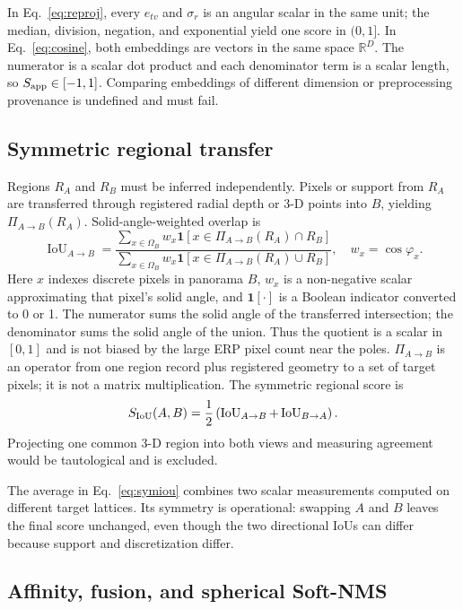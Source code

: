 \documentclass[a4paper,9pt]{extarticle}
\newcommand{\R}{\mathbb R}
\newcommand{\IoU}{\operatorname{IoU}}
\begin{document}
In Eq.~\ref{eq:reproj}, every $e_{tv}$ and $\sigma_r$ is an angular scalar in
the same unit; the median, division, negation, and exponential yield one score
in $(0,1]$. In Eq.~\ref{eq:cosine}, both embeddings are vectors in the same
space $\R^D$. The numerator is a scalar dot product and each denominator term
is a scalar length, so $S_{\rm app}\in[-1,1]$. Comparing embeddings of
different dimension or preprocessing provenance is undefined and must fail.

\subsection{Symmetric regional transfer}

Regions $R_A$ and $R_B$ must be inferred independently. Pixels or support from $R_A$ are transferred through registered radial depth or 3-D points into $B$, yielding $\Pi_{A\rightarrow B}(R_A)$. Solid-angle-weighted overlap is
\begin{equation}
 \IoU_{A\rightarrow B}=
 \frac{\sum_{x\in\Omega_B}w_x
 \mathbf1[x\in\Pi_{A\rightarrow B}(R_A)\cap R_B]}
 {\sum_{x\in\Omega_B}w_x
 \mathbf1[x\in\Pi_{A\rightarrow B}(R_A)\cup R_B]},
 \quad w_x=\cos\varphi_x.
 \label{eq:transferiou}
\end{equation}
Here $x$ indexes discrete pixels in panorama $B$, $w_x$ is a non-negative
scalar approximating that pixel's solid angle, and $\mathbf1[\cdot]$ is a
Boolean indicator converted to 0 or 1. The numerator sums the solid angle of
the transferred intersection; the denominator sums the solid angle of the
union. Thus the quotient is a scalar in $[0,1]$ and is not biased by the large
ERP pixel count near the poles. $\Pi_{A\rightarrow B}$ is an operator from one
region record plus registered geometry to a set of target pixels; it is not a
matrix multiplication.
The symmetric regional score is
\begin{equation}
 S_{\rm IoU}(A,B)=\frac12
 \left(\IoU_{A\rightarrow B}+
 \IoU_{B\rightarrow A}\right).
 \label{eq:symiou}
\end{equation}
Projecting one common 3-D region into both views and measuring agreement would be tautological and is excluded.

The average in Eq.~\ref{eq:symiou} combines two scalar measurements computed
on different target lattices. Its symmetry is operational: swapping $A$ and
$B$ leaves the final score unchanged, even though the two directional IoUs can
differ because support and discretization differ.

\subsection{Affinity, fusion, and spherical Soft-NMS}
\end{document}
